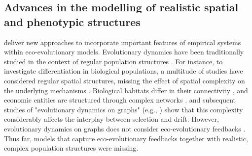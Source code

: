 % 

\subsection{Advances in the modelling of realistic spatial and phenotypic structures}

\Cref{\chapi,\chapiv} deliver new approaches to incorporate important features of empirical systems within eco-evolutionary models.
% 
% 
Evolutionary dynamics have been traditionally studied in the context of regular population structures \citep{LiebermanHauert2005}.
% 
For instance, to investigate differentiation in biological populations, a multitude of studies have considered regular spatial structures, missing the effect of spatial complexity on the underlying mechanisms \citep{Slatkin1973,Slatkin1978,Kirkpatrick1997,Polechova2015,Polechova2018,AndradeRestrepo2019,Doebeli2003,Meszena1997,Yeaman2011,Debarre2013,Mirrahimi2020}.
% 
Biological habitats differ in their connectivity \citep{Dale2010}, and economic entities are structured through complex networks \citep{Schweitzer2009}. \cite{LiebermanHauert2005} and subsequent studies of "evolutionary dynamics on graphs" (e.g., \cite{Tkadlec2019}) show that this complexity considerably affects the interplay between selection and drift. However, evolutionary dynamics on graphs does not consider eco-evolutionary feedbacks \citep{Govaert2019}.
% 
Thus far, models that capture eco-evolutionary feedbacks together with realistic, complex population structures were missing.

